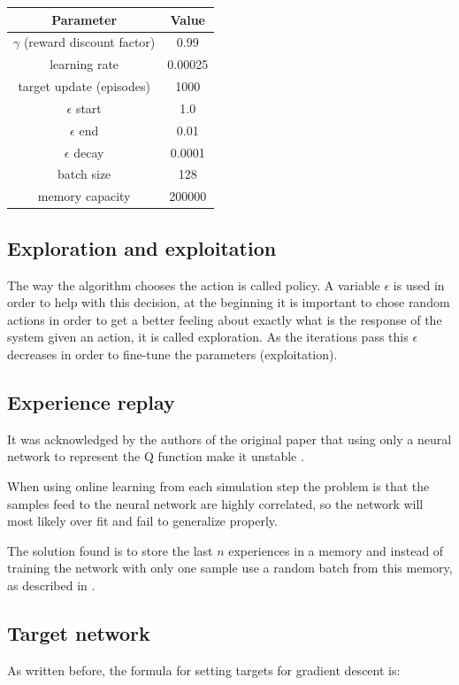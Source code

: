 \documentclass{article}
\newcommand{\targetUpdate}{1000}
\begin{document}
\begin{center}
\begin{tabular}{ |c|c| }
 \hline
 \textbf{Parameter} & \textbf{Value} \\ 
 \hline
 $\gamma$ (reward discount factor) & 0.99 \\ 
 learning rate & 0.00025 \\
 target update (episodes) & \targetUpdate{} \\ 
 $\epsilon$ start & 1.0 \\ 
 $\epsilon$ end & 0.01 \\ 
 $\epsilon$ decay & 0.0001 \\ 
 batch size & 128 \\ 
 memory capacity & 200000 \\ 
 \hline
\end{tabular}
\end{center}

\subsection{Exploration and exploitation}
The way the algorithm chooses the action is called policy. A variable $\epsilon$ is used in order to help with this decision, at the beginning it is important to chose random actions in order to get a better feeling about exactly what is the response of the system given an action, it is called exploration. As the iterations pass this $\epsilon$ decreases in order to fine-tune the parameters (exploitation).

\subsection{Experience replay}
It was acknowledged by the authors of the original paper that using only a neural network to represent the Q function make it unstable \cite{deepQLearning}.

When using online learning from each simulation step the problem is that the samples feed to the neural network are highly correlated, so the network will most likely over fit and fail to generalize properly.

The solution found is to store the last $n$ experiences in a memory and instead of training the network with only one sample use a random batch from this memory, as described in \cite{experienceReplay}.

\subsection{Target network}
As written before, the formula for setting targets for gradient descent is:
\end{document}
